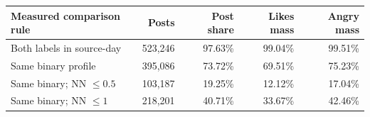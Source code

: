 \begin{tabular}{lrrrr}
\toprule
Measured comparison rule & Posts & Post share & Likes mass & Angry mass \\
\midrule
Both labels in source-day & 523,246 & 97.63\% & 99.04\% & 99.51\% \\
Same binary profile & 395,086 & 73.72\% & 69.51\% & 75.23\% \\
Same binary; NN $\leq0.5$ & 103,187 & 19.25\% & 12.12\% & 17.04\% \\
Same binary; NN $\leq1$ & 218,201 & 40.71\% & 33.67\% & 42.46\% \\
\bottomrule
\end{tabular}
